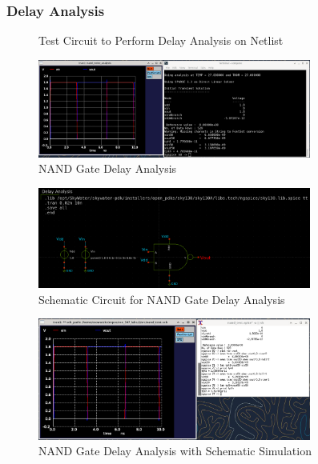 \documentclass{article}
\begin{document}
	\subsubsection{Delay Analysis}
	\begin{figure}[H]
		
		\caption{Test Circuit to Perform Delay Analysis on Netlist}
		\label{fig::nand_delay_analysis_test_circuit}
	\end{figure}
	
	\begin{figure}[H]
		\centerline{\includegraphics[width=0.8\textwidth]{nand_delay_analysis.png}}
		\caption{NAND Gate Delay Analysis}
		\label{fig::nand_delay_analysis}
	\end{figure}
	
	\begin{figure}[H]
		\centerline{\includegraphics[width=0.8\textwidth]{nand_delay_analysis_test_circuit.png}}
		\caption{Schematic Circuit for NAND Gate Delay Analysis}
		\label{fig::nand_delay_analysis_test_circuit}
	\end{figure}
	
	\begin{figure}[H]
		\centerline{\includegraphics[width=0.8\textwidth]{nand_delay_analysis_schem.png}}
		\caption{NAND Gate Delay Analysis with Schematic Simulation}
		\label{fig::nand_delay_analysis_schem}
	\end{figure}
	
\end{document}
